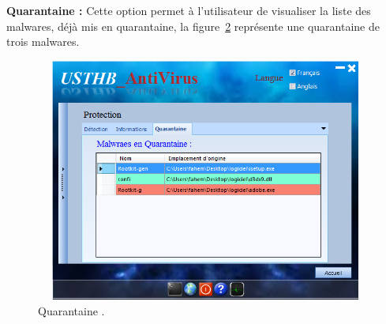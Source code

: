 \begin{list}{•}{}
\begin{figure}[H]
\begin{center}
\label{fig :ant9} 
\end{center}
\end{figure}
\item \textbf{Quarantaine : }Cette option permet à l'utilisateur de visualiser la liste des malwares, déjà mis en quarantaine, la figure~\ref{fig :ant10} représente une quarantaine de trois malwares.  
\begin{figure}[H]
\begin{center}
\includegraphics[width=13cm, height=8cm]{Figures/ant10.png}
\caption{Quarantaine .}
\label{fig :ant10} 
\end{center}
\end{figure}
\end{list}
